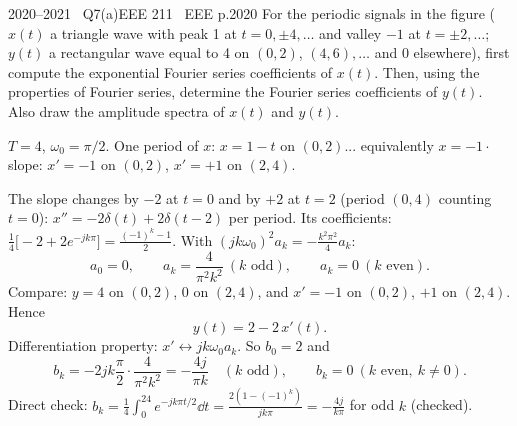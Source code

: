 \begin{qcard}{2020--2021 \textbullet\ Q7(a)}{EEE 211 \textbullet\ EEE p.20}{20}
For the periodic signals in the figure ($x(t)$ a triangle wave with peak 1 at $t=0,\pm4,\dots$ and valley $-1$ at $t=\pm2,\dots$; $y(t)$ a rectangular wave equal to 4 on $(0,2)$, $(4,6),\dots$ and 0 elsewhere), first compute the exponential Fourier series coefficients of $x(t)$. Then, using the properties of Fourier series, determine the Fourier series coefficients of $y(t)$. Also draw the amplitude spectra of $x(t)$ and $y(t)$.
\end{qcard}
\begin{solution}
$T=4$, $\omega_0=\pi/2$. One period of $x$: $x=1-t$ on $(0,2)$... equivalently $x=-1\cdot$ slope: $x'=-1$ on $(0,2)$, $x'=+1$ on $(2,4)$.

 The slope changes by $-2$ at $t=0$ and by $+2$ at $t=2$ (period $(0,4)$ counting $t=0$): $x''=-2\delta(t)+2\delta(t-2)$ per period. Its coefficients: $\frac14\big[-2+2e^{-jk\pi}\big]=\frac{(-1)^k-1}{2}$. With $(jk\omega_0)^2a_k=-\frac{k^2\pi^2}{4}a_k$:
\[
a_0=0,\qquad a_k=\frac{4}{\pi^2k^2}\ (k\text{ odd}),\qquad a_k=0\ (k\text{ even}).
\]
 Compare: $y=4$ on $(0,2)$, $0$ on $(2,4)$, and $x'=-1$ on $(0,2)$, $+1$ on $(2,4)$. Hence
\[y(t)=2-2\,x'(t).\]
Differentiation property: $x'\leftrightarrow jk\omega_0a_k$. So $b_0=2$ and
\[b_k=-2jk\frac\pi2\cdot\frac{4}{\pi^2k^2}=-\frac{4j}{\pi k}\quad(k\text{ odd}),\qquad b_k=0\ (k\text{ even},\ k\ne0).\]
Direct check: $b_k=\frac14\int_0^24e^{-jk\pi t/2}\dd t=\frac{2(1-(-1)^k)}{jk\pi}=-\frac{4j}{k\pi}$ for odd $k$ (checked).
\begin{center}
\hspace{2mm}
\end{center}
\end{solution}

